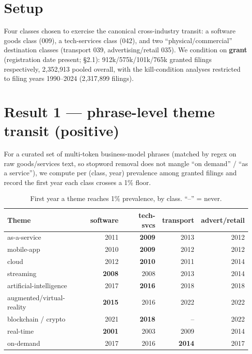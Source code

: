 \documentclass[11pt]{article}
\begin{document}
\section{Setup}
Four classes chosen to exercise the canonical cross-industry transit: a software
goods class (009), a tech-services class (042), and two ``physical/commercial''
destination classes (transport 039, advertising/retail 035). We condition on
\textbf{grant} (registration date present; §2.1): 912k/575k/101k/765k granted
filings respectively, 2{,}352{,}913 pooled overall, with the kill-condition
analyses restricted to filing years 1990--2024 (2{,}317{,}899 filings).

\section{Result 1 --- phrase-level theme transit (positive)}
For a curated set of multi-token business-model phrases (matched by regex on raw
goods/services text, so stopword removal does not mangle ``on demand'' /
``as a service''), we compute per (class, year) prevalence among granted filings
and record the first year each class crosses a 1\% floor.

\begin{table}[h]\centering\small
\caption{First year a theme reaches 1\% prevalence, by class. ``--'' = never.}
\begin{tabular}{lrrrr}
\toprule
Theme & software & tech-svcs & transport & advert/retail \\
\midrule
as-a-service           & 2011 & \textbf{2009} & 2013 & 2012 \\
mobile-app             & 2010 & \textbf{2009} & 2012 & 2012 \\
cloud                  & 2012 & \textbf{2010} & 2011 & 2014 \\
streaming              & \textbf{2008} & 2008 & 2013 & 2014 \\
artificial-intelligence& 2017 & \textbf{2016} & 2018 & 2018 \\
augmented/virtual-reality & \textbf{2015} & 2016 & 2022 & 2022 \\
blockchain / crypto    & 2021 & \textbf{2018} & --   & 2022 \\
real-time              & \textbf{2001} & 2003 & 2009 & 2014 \\
on-demand              & 2017 & 2016 & \textbf{2014} & 2017 \\
\bottomrule
\end{tabular}
\end{table}
\end{document}
